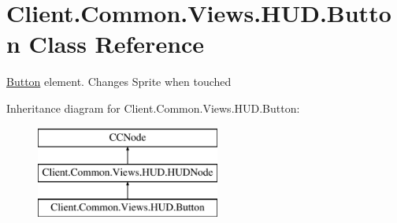 \hypertarget{classClient_1_1Common_1_1Views_1_1HUD_1_1Button}{}\section{Client.\+Common.\+Views.\+H\+U\+D.\+Button Class Reference}
\label{classClient_1_1Common_1_1Views_1_1HUD_1_1Button}


\hyperlink{classClient_1_1Common_1_1Views_1_1HUD_1_1Button}{Button} element. Changes Sprite when touched  


Inheritance diagram for Client.\+Common.\+Views.\+H\+U\+D.\+Button\+:\begin{figure}[H]
\begin{center}
\leavevmode
\includegraphics[height=3.000000cm]{classClient_1_1Common_1_1Views_1_1HUD_1_1Button}
\end{center}
\end{figure}
